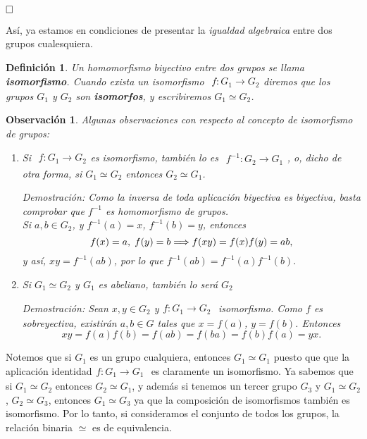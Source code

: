 \documentclass[12pt]{article}
\newtheorem{definition}[theorem]{Definición}
\newtheorem{observation}{Observación}[theorem]
\begin{document}
$\hfill \square$

Así, ya estamos en condiciones de presentar la \textit{igualdad algebraica} entre dos grupos cualesquiera.

\begin{definition}
Un homomorfismo biyectivo entre dos grupos se llama \textbf{isomorfismo}. Cuando exista un isomorfismo $
\begin{array}{rccl}
f\colon G_{1} \longrightarrow  G_{2}
\end{array}
$diremos que los grupos $G_{1}$ y $G_{2}$ son \textbf{isomorfos}, y escribiremos $G_{1}\simeq G_{2}$.
\end{definition}

\begin{observation} Algunas observaciones con respecto al concepto de isomorfismo de grupos:
\begin{enumerate}
\item Si $
\begin{array}{rccl}
f\colon G_{1} \longrightarrow  G_{2}
\end{array}
$es isomorfismo, también lo es $
\begin{array}{rccl}
f^{-1}\colon G_{2} \longrightarrow  G_{1}
\end{array}
$, o, dicho de otra forma, si $G_{1}\simeq G_{2}$ entonces $G_{2}\simeq G_{1}$.

\emph{Demostración: }Como la inversa de toda aplicación biyectiva es biyectiva, basta comprobar que $f^{-1}$ es homomorfismo de grupos.\vspace{0.2cm}\\
Si $a,b \in G_{2}$, y $f^{-1}(a)= x$, $f^{-1}(b) = y$, entonces $$f(x) = a, \hspace{0.1cm} f(y) = b\Longrightarrow f(xy) = f(x)f(y) = ab,$$ y así, $xy = f^{-1}(ab)$, por lo que $f^{-1}(ab) = f^{-1}(a)f^{-1}(b).$
\item Si $G_{1}\simeq G_{2}$ y $G_{1}$ es abeliano, también lo será $G_{2}$

\emph{Demostración: }Sean $x,y \in G_{2}$ y$
\begin{array}{rccl}
f\colon G_{1} \longrightarrow  G_{2}
\end{array}
$ isomorfismo. Como $f$ es sobreyectiva, existirán $a,b \in G$ tales que $x = f(a)$, $y = f(b)$. Entonces $$xy = f(a)f(b) = f(ab) = f(ba) = f(b)f(a) = yx.$$
\end{enumerate}
\end{observation}

Notemos que si $G_{1}$ es un grupo cualquiera, entonces $G_{1} \simeq G_{1}$ puesto que que la aplicación identidad$
\begin{array}{rccl}
f\colon G_{1} \longrightarrow  G_{1}
\end{array}
$ es claramente un isomorfismo. Ya sabemos que si $G_{1}\simeq G_{2}$ entonces $G_{2} \simeq G_{1}$, y además si tenemos un tercer grupo $G_{3}$ y $G_{1} \simeq G_{2}$, $G_{2} \simeq G_{3}$, entonces $G_{1} \simeq G_{3}$ ya que la composición de isomorfismos también es isomorfismo. Por lo tanto, si consideramos el conjunto de todos los grupos, la relación binaria $\simeq$ es de equivalencia.
\end{document}

